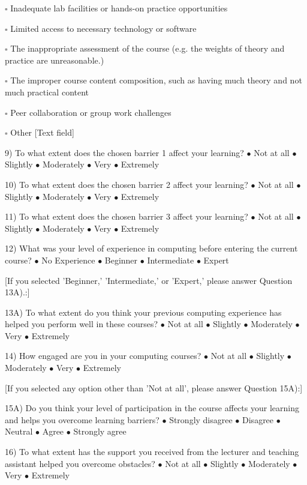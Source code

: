 \documentclass{article}
\begin{document}
$\square$ Inadequate lab facilities or hands-on practice opportunities

$\square$ Limited access to necessary technology or software

$\square$ The inappropriate assessment of the course (e.g. the weights of theory and practice are unreasonable.)

$\square$ The improper course content composition, such as having much theory and not much practical content

$\square$ Peer collaboration or group work challenges

$\square$ Other [Text field]

9) To what extent does the chosen barrier 1 affect your learning?
$\bullet $ Not at all $\bullet $ Slightly $\bullet $ Moderately $\bullet $ Very $\bullet $ Extremely

10) To what extent does the chosen barrier 2 affect your learning?
$\bullet $ Not at all $\bullet $ Slightly $\bullet $ Moderately $\bullet $ Very $\bullet $ Extremely

11) To what extent does the chosen barrier 3 affect your learning?
$\bullet $ Not at all $\bullet $ Slightly $\bullet $ Moderately $\bullet $ Very $\bullet $ Extremely

12) What was your level of experience in computing before entering the current course?
$\bullet $ No Experience $\bullet $ Beginner $\bullet $ Intermediate $\bullet $ Expert

[If you selected 'Beginner,' 'Intermediate,' or 'Expert,' please answer Question 13A).:]

13A) To what extent do you think your previous computing experience has helped you perform well in these courses?
$\bullet $ Not at all $\bullet $ Slightly $\bullet $ Moderately $\bullet $ Very $\bullet $ Extremely

14) How engaged are you in your computing courses?
$\bullet $ Not at all $\bullet $ Slightly $\bullet $ Moderately $\bullet $ Very $\bullet $ Extremely

[If you selected any option other than 'Not at all', please answer Question 15A):]

15A) Do you think your level of participation in the course affects your learning and helps you overcome learning barriers?
$\bullet $ Strongly disagree $\bullet $ Disagree $\bullet $ Neutral $\bullet $ Agree $\bullet $ Strongly agree

16) To what extent has the support you received from the lecturer and teaching assistant helped you overcome obstacles?
$\bullet $ Not at all $\bullet $ Slightly $\bullet $ Moderately $\bullet $ Very $\bullet $ Extremely
\end{document}
